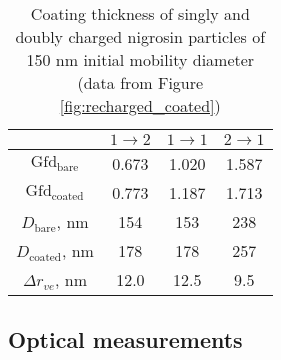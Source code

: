 \begin{table}[htp]
    \centering
    \caption{Coating thickness of singly and doubly charged nigrosin particles of 150 nm initial mobility diameter (data from Figure \ref{fig:recharged_coated})}
    \begin{tabular}{c c c c}
        \hline
        & $1\rightarrow 2$ & $1\rightarrow 1$ & $2\rightarrow 1$ \\
        \hline
        $\mathrm{Gfd}_\mathrm{bare}$ & 0.673 & 1.020 & 1.587\\
        $\mathrm{Gfd}_\mathrm{coated}$ & 0.773 & 1.187 & 1.713\\
        $D_{\mathrm{bare}}$, nm & 154 & 153 & 238 \\
        $D_{\mathrm{coated}}$, nm & 178 & 178 & 257 \\
        $\Delta r_{ve}$, nm & 12.0 & 12.5 & 9.5 \\
        \hline
    \end{tabular}
    \label{tab:recharged_coated}
\end{table}

\subsection{Optical measurements}


